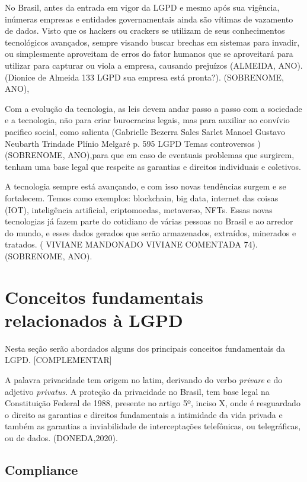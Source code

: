\documentclass[
	12pt,				%
	openright,			%
	oneside,			%
	a4paper,			%
	english,			%
	french,				%
	spanish,			%
	brazil,				%
	]{abntex2}
\begin{document}
No Brasil, antes da entrada em vigor da LGPD e mesmo após sua vigência, inúmeras empresas e entidades governamentais ainda são vítimas de vazamento de dados. Visto que os hackers ou crackers se utilizam de seus conhecimentos tecnológicos avançados, sempre visando  buscar brechas em sistemas para invadir, ou simplesmente aproveitam de erros do fator humanos que se aproveitará para utilizar para capturar ou viola a empresa, causando prejuízos (ALMEIDA, ANO). (Dionice de Almeida 133 LGPD sua empresa está pronta?). (SOBRENOME, ANO),

Com a evolução da tecnologia, as leis devem andar passo a passo com a sociedade e a tecnologia, não para criar burocracias legais, mas para auxiliar ao convívio pacifico social, como salienta (Gabrielle Bezerra Sales Sarlet Manoel Gustavo Neubarth Trindade Plínio Melgaré p. 595 LGPD Temas controversos ) (SOBRENOME, ANO),para que em caso de eventuais problemas que surgirem, tenham uma base legal que respeite as garantias e direitos individuais e coletivos. 

A tecnologia sempre está avançando, e com isso novas tendências surgem e se fortalecem. Temos como exemplos: blockchain, big data, internet das coisas (IOT), inteligência artificial, criptomoedas, metaverso, NFTs. Essas novas tecnologias já fazem parte do cotidiano de várias pessoas no Brasil e ao arredor do mundo, e esses dados gerados que serão armazenados, extraídos, minerados e tratados. ( VIVIANE MANDONADO VIVIANE COMENTADA 74). (SOBRENOME, ANO).


\section{Conceitos fundamentais relacionados à LGPD}
\label{sec: exemplo}

Nesta seção serão abordados alguns dos principais conceitos fundamentais da LGPD.
[COMPLEMENTAR]

A palavra privacidade tem origem no latim, derivando do verbo \textit{privare} e do adjetivo \textit{privatus}. A proteção da privacidade no Brasil, tem base legal na Constituição Federal de 1988, presente no artigo 5º, inciso X, onde é resguardado o direito as garantias e direitos fundamentais a intimidade da vida privada e também as garantias a inviabilidade de interceptações telefônicas, ou telegráficas, ou de dados. (DONEDA,2020).


\subsection{Compliance}
\end{document}
